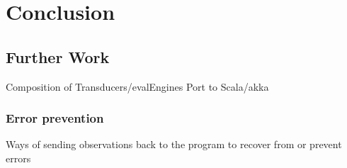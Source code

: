 %
\chapter{Conclusion}
\label{sec:conclusion}

\section{Further Work}

Composition of Transducers/evalEngines
Port to Scala/akka

\subsection{Error prevention}
Ways of sending observations back to the program to recover from or prevent errors

